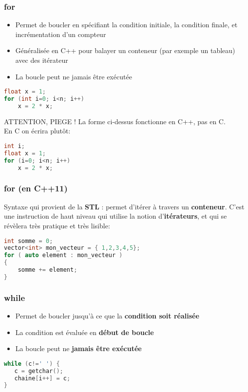 \documentclass{beamer}
\begin{document}
\begin{frame}[fragile=singleslide,shrink=20]
\frametitle {for}
\begin{itemize}
\item{Permet de boucler en spécifiant la condition initiale, la condition finale, et incrémentation d'un compteur}
\item{Généralisée en C++ pour balayer un conteneur (par exemple un tableau) avec des itérateur}
\item{La boucle peut ne jamais être exécutée}
\end{itemize}
\begin{lstlisting}[language=c++]
float x = 1;
for (int i=0; i<n; i++)
    x = 2 * x;
\end{lstlisting}
\begin{block}{ATTENTION, PIEGE !}
La forme ci-dessus fonctionne en C++, pas en C. \\
En C on écrira plutôt:
\begin{lstlisting}[language=c++]
int i;
float x = 1;
for (i=0; i<n; i++)
    x = 2 * x;
\end{lstlisting}
\end{block}
\end{frame}

\begin{frame}[fragile=singleslide,shrink=20]
\frametitle {for (en C++11) }
Syntaxe qui provient de la \textbf{STL} : permet d'itérer à travers un \textbf{conteneur}. C'est une instruction de haut niveau
qui utilise la notion d'\textbf{itérateurs}, et qui se révèlera très pratique et très lisible:

\begin{lstlisting}[language=c++]
int somme = 0;
vector<int> mon_vecteur = { 1,2,3,4,5};
for ( auto element : mon_vecteur )
{
    somme += element;
}
\end{lstlisting}
\end{frame}

\begin{frame}[fragile=singleslide,shrink=20]
\frametitle {while}
\begin{itemize}
\item{Permet de boucler jusqu'à ce que la \textbf{condition soit réalisée}}
\item{La condition est évaluée en \textbf{début de boucle}}
\item{La boucle peut ne \textbf{jamais être exécutée}}
\end{itemize}


\begin{lstlisting}[language=c++]
while (c!=' ') {
   c = getchar();
   chaine[i++] = c;
}
\end{lstlisting}
\end{frame}
\end{document}
